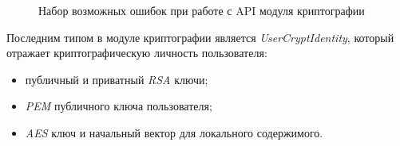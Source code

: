 \begin{figure}[h]
	
   \caption{Набор возможных ошибок при работе с API модуля криптографии}
   \label{sec:development:client:encryption:code:errors}
\end{figure}

Последним типом в модуле криптографии является \textit{UserCryptIdentity}, который отражает криптографическую личность пользователя:
\begin{itemize}
	\item публичный и приватный \textit{RSA} ключи;
	\item \textit{PEM} публичного ключа пользователя;
	\item \textit{AES} ключ и начальный вектор для локального содержимого.
\end{itemize}